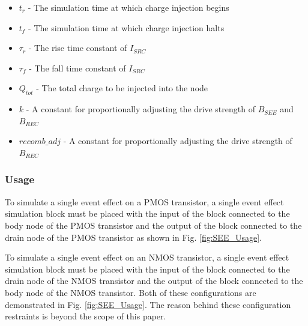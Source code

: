 \documentclass[conference]{IEEEtran}
\begin{document}
    \begin{itemize}

        \item[] \(t_r\) - The simulation time at which charge injection begins

        \item[] \(t_f\) - The simulation time at which charge injection halts

        \item[] \(\tau_r\) - The rise time constant of \(I_{SRC}\)

        \item[] \(\tau_f\) - The fall time constant of \(I_{SRC}\)

        \item[] \(Q_{tot}\) - The total charge to be injected into the node

        \item[] \(k\) - A constant for proportionally adjusting the drive strength of \(B_{SEE}\) and \(B_{REC}\)

        \item[] \(recomb\_adj\) - A constant for proportionally adjusting the drive strength of \(B_{REC}\)

    \end{itemize}
    \vspace{1em}

    \subsubsection{Usage}
    To simulate a single event effect on a PMOS transistor, a single event effect simulation block must be placed with the input of the block connected to the body node of the PMOS transistor and the output of the block connected to the drain node of the PMOS transistor as shown in Fig. \ref{fig:SEE_Usage}.

    To simulate a single event effect on an NMOS transistor, a single event effect simulation block must be placed with the input of the block connected to the drain node of the NMOS transistor and the output of the block connected to the body node of the NMOS transistor.
    Both of these configurations are demonstrated in Fig. \ref{fig:SEE_Usage}.
    The reason behind these configuration restraints is beyond the scope of this paper.
\end{document}
